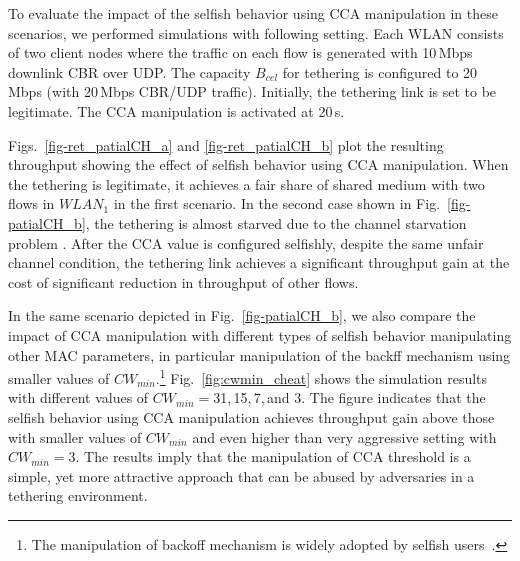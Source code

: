 To evaluate the impact of the selfish behavior using CCA manipulation
in these scenarios, we performed simulations with following setting.
Each WLAN consists of two client nodes where the traffic on each flow
is generated with 10\,Mbps downlink CBR over UDP.
The capacity $B_{cel}$ for tethering is configured to 20\,Mbps
(with 20\,Mbps CBR/UDP traffic).
Initially, the tethering link is set to be legitimate.
The CCA manipulation is activated at 20\,s.

Figs.~\ref{fig-ret_patialCH_a} and \ref{fig-ret_patialCH_b} plot
the resulting throughput showing the effect of selfish behavior
using CCA manipulation.
When the tethering is legitimate, it achieves a fair share of shared
medium with two flows in $WLAN_1$ in the first scenario.
In the second case shown in Fig.~\ref{fig-patialCH_b},
the tethering is almost starved due to the channel starvation
problem \cite{zhang:shin11icnp}.
After the CCA value is configured selfishly,
despite the same unfair channel condition,
the tethering link achieves a significant throughput gain
at the cost of significant reduction in throughput of other flows.

In the same scenario depicted in Fig.~\ref{fig-patialCH_b},
we also compare the impact of CCA manipulation with
different types of selfish behavior manipulating other MAC parameters,
in particular manipulation of the backff mechanism using
smaller values of $CW_{min}$.\footnote{The manipulation of backoff mechanism
is widely adopted by selfish users~\cite{K:Vaidya05}.}
%
Fig.~\ref{fig:cwmin_cheat} shows the simulation results
with different values of $CW_{min}=$31,\,15,\,7,\,and 3.
%
The figure indicates that the selfish behavior using CCA manipulation
achieves throughput gain above those with smaller values of $CW_{min}$
and even higher than very aggressive setting with $CW_{min}=3$.
%
The results imply that the manipulation of CCA threshold is a simple,
yet more attractive approach that can be abused by adversaries in
a tethering environment.

